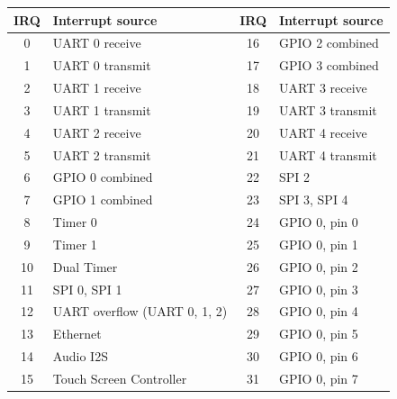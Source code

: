 \documentclass[a4paper,11pt]{article}
\begin{document}
\begin{table}[H]
	\centering
	\begin{tabular}{c|l@{\hspace{2cm}}c|l}
		\hline
		\textbf{IRQ} & \textbf{Interrupt source}    & \textbf{IRQ} & \textbf{Interrupt source} \\
		\hline
		0            & UART 0 receive               & 16           & GPIO 2 combined           \\
		1            & UART 0 transmit              & 17           & GPIO 3 combined           \\
		2            & UART 1 receive               & 18           & UART 3 receive            \\
		3            & UART 1 transmit              & 19           & UART 3 transmit           \\
		4            & UART 2 receive               & 20           & UART 4 receive            \\
		5            & UART 2 transmit              & 21           & UART 4 transmit           \\
		6            & GPIO 0 combined              & 22           & SPI 2                     \\
		7            & GPIO 1 combined              & 23           & SPI 3, SPI 4              \\
		8            & Timer 0                      & 24           & GPIO 0, pin 0             \\
		9            & Timer 1                      & 25           & GPIO 0, pin 1             \\
		10           & Dual Timer                   & 26           & GPIO 0, pin 2             \\
		11           & SPI 0, SPI 1                 & 27           & GPIO 0, pin 3             \\
		12           & UART overflow (UART 0, 1, 2) & 28           & GPIO 0, pin 4             \\
		13           & Ethernet                     & 29           & GPIO 0, pin 5             \\
		14           & Audio I2S                    & 30           & GPIO 0, pin 6             \\
		15           & Touch Screen Controller      & 31           & GPIO 0, pin 7             \\
		\hline
	\end{tabular}
\end{table}
\end{document}

